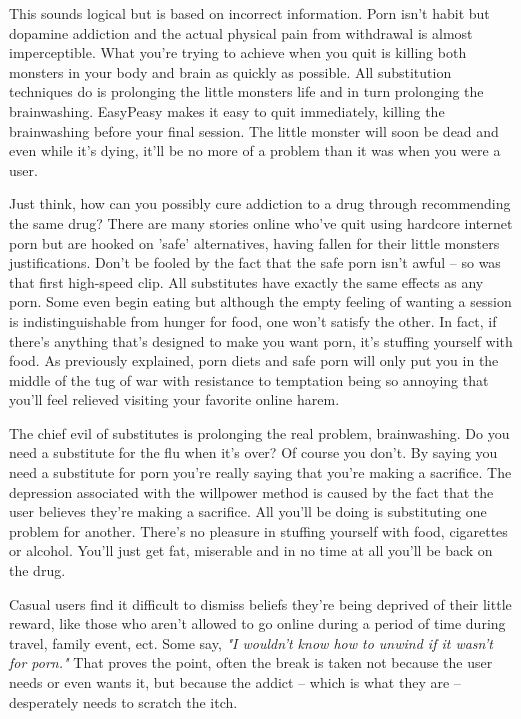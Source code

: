 \documentclass[easypeasy.tex]{subfiles}
\begin{document}
This sounds logical but is based on incorrect information. Porn isn't habit but dopamine addiction and the actual physical pain from withdrawal is almost imperceptible. What you're trying to achieve when you quit is killing both monsters in your body and brain as quickly as possible. All substitution techniques do is prolonging the little monsters life and in turn prolonging the brainwashing. EasyPeasy makes it easy to quit immediately, killing the brainwashing before your final session. The little monster will soon be dead and even while it's dying, it'll be no more of a problem than it was when you were a user.

Just think, how can you possibly cure addiction to a drug through recommending the same drug? There are many stories online who've quit using hardcore internet porn but are hooked on 'safe' alternatives, having fallen for their little monsters justifications. Don't be fooled by the fact that the safe porn isn't awful -- so was that first high-speed clip. All substitutes have exactly the same effects as any porn. Some even begin eating but although the empty feeling of wanting a session is indistinguishable from hunger for food, one won't satisfy the other. In fact, if there's anything that's designed to make you want porn, it's stuffing yourself with food. As previously explained, porn diets and safe porn will only put you in the middle of the tug of war with resistance to temptation being so annoying that you'll feel relieved visiting your favorite online harem.

The chief evil of substitutes is prolonging the real problem, brainwashing. Do you need a substitute for the flu when it's over? Of course you don't. By saying you need a substitute for porn you're really saying that you're making a sacrifice. The depression associated with the willpower method is caused by the fact that the user believes they're making a sacrifice. All you'll be doing is substituting one problem for another. There's no pleasure in stuffing yourself with food, cigarettes or alcohol. You'll just get fat, miserable and in no time at all you'll be back on the drug.

Casual users find it difficult to dismiss beliefs they're being deprived of their little reward, like those who aren't allowed to go online during a period of time during travel, family event, ect. Some say, \textit{"I wouldn't know how to unwind if it wasn't for porn."} That proves the point, often the break is taken not because the user needs or even wants it, but because the addict -- which is what they are -- desperately needs to scratch the itch.
\end{document}

